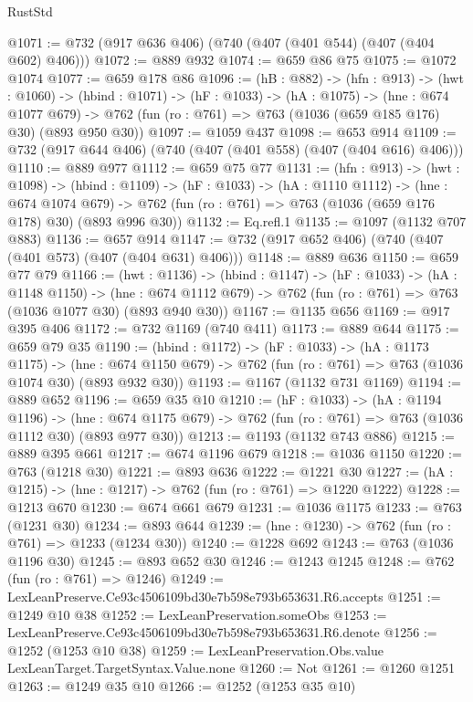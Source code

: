 \begin{lexlean}{RustStd}
\begin{coremodule}
@1071 := @732 (@917 @636 @406) (@740 (@407 (@401 @544) (@407 (@404 @602) @406)))
@1072 := @889 @932
@1074 := @659 @86 @75
@1075 := @1072 @1074
@1077 := @659 @178 @86
@1096 := (hB : @882) ->
  (hfn : @913) ->
  (hwt : @1060) ->
  (hbind : @1071) ->
  (hF : @1033) ->
  (hA : @1075) ->
  (hne : @674 @1077 @679) ->
  @762 (fun (ro : @761) => @763 (@1036 (@659 @185 @176) @30) (@893 @950 @30))
@1097 := @1059 @437
@1098 := @653 @914
@1109 := @732 (@917 @644 @406) (@740 (@407 (@401 @558) (@407 (@404 @616) @406)))
@1110 := @889 @977
@1112 := @659 @75 @77
@1131 := (hfn : @913) ->
  (hwt : @1098) ->
  (hbind : @1109) ->
  (hF : @1033) ->
  (hA : @1110 @1112) ->
  (hne : @674 @1074 @679) ->
  @762 (fun (ro : @761) => @763 (@1036 (@659 @176 @178) @30) (@893 @996 @30))
@1132 := Eq.refl.{1}
@1135 := @1097 (@1132 @707 @883)
@1136 := @657 @914
@1147 := @732 (@917 @652 @406) (@740 (@407 (@401 @573) (@407 (@404 @631) @406)))
@1148 := @889 @636
@1150 := @659 @77 @79
@1166 := (hwt : @1136) ->
  (hbind : @1147) ->
  (hF : @1033) ->
  (hA : @1148 @1150) ->
  (hne : @674 @1112 @679) -> @762 (fun (ro : @761) => @763 (@1036 @1077 @30) (@893 @940 @30))
@1167 := @1135 @656
@1169 := @917 @395 @406
@1172 := @732 @1169 (@740 @411)
@1173 := @889 @644
@1175 := @659 @79 @35
@1190 := (hbind : @1172) ->
  (hF : @1033) ->
  (hA : @1173 @1175) ->
  (hne : @674 @1150 @679) -> @762 (fun (ro : @761) => @763 (@1036 @1074 @30) (@893 @932 @30))
@1193 := @1167 (@1132 @731 @1169)
@1194 := @889 @652
@1196 := @659 @35 @10
@1210 := (hF : @1033) ->
  (hA : @1194 @1196) ->
  (hne : @674 @1175 @679) -> @762 (fun (ro : @761) => @763 (@1036 @1112 @30) (@893 @977 @30))
@1213 := @1193 (@1132 @743 @886)
@1215 := @889 @395 @661
@1217 := @674 @1196 @679
@1218 := @1036 @1150
@1220 := @763 (@1218 @30)
@1221 := @893 @636
@1222 := @1221 @30
@1227 := (hA : @1215) -> (hne : @1217) -> @762 (fun (ro : @761) => @1220 @1222)
@1228 := @1213 @670
@1230 := @674 @661 @679
@1231 := @1036 @1175
@1233 := @763 (@1231 @30)
@1234 := @893 @644
@1239 := (hne : @1230) -> @762 (fun (ro : @761) => @1233 (@1234 @30))
@1240 := @1228 @692
@1243 := @763 (@1036 @1196 @30)
@1245 := @893 @652 @30
@1246 := @1243 @1245
@1248 := @762 (fun (ro : @761) => @1246)
@1249 := LexLeanPreserve.Ce93c4506109bd30e7b598e793b653631.R6.accepts
@1251 := @1249 @10 @38
@1252 := LexLeanPreservation.someObs
@1253 := LexLeanPreserve.Ce93c4506109bd30e7b598e793b653631.R6.denote
@1256 := @1252 (@1253 @10 @38)
@1259 := LexLeanPreservation.Obs.value LexLeanTarget.TargetSyntax.Value.none
@1260 := Not
@1261 := @1260 @1251
@1263 := @1249 @35 @10
@1266 := @1252 (@1253 @35 @10)

\end{coremodule}
\end{lexlean}
